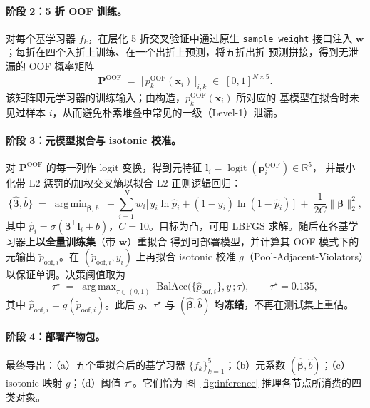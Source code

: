 \documentclass[UTF8,11pt,a4paper,fontset=ubuntu]{ctexart}
\newcommand{\Pof}{\mathbf{P}^{\mathrm{OOF}}}
\newcommand{\logit}{\operatorname{logit}}
\newcommand{\RR}{\mathbb{R}}
\newcommand{\ptilde}{\tilde p}
\newcommand{\phat}{\hat p}
\newcommand{\taustar}{\tau^{\star}}
\DeclareMathOperator*{\argmin}{arg\,min}
\DeclareMathOperator*{\argmax}{arg\,max}
\begin{document}
\paragraph{阶段 2：5 折 OOF 训练。}
对每个基学习器 $f_k$，在层化 5 折交叉验证中通过原生 \texttt{sample\_weight}
接口注入 $\mathbf{w}$；每折在四个入折上训练、在一个出折上预测，将五折出折
预测拼接，得到无泄漏的 OOF 概率矩阵
\[
\Pof \;=\; \bigl[\,p_k^{\mathrm{OOF}}(\mathbf{x}_i)\,\bigr]_{i,k}
\;\in\; [0,1]^{N\times 5}.
\]
该矩阵即元学习器的训练输入；由构造，$p_k^{\mathrm{OOF}}(\mathbf{x}_i)$ 所对应的
基模型在拟合时未见过样本 $i$，从而避免朴素堆叠中常见的一级（Level-1）泄漏。

\paragraph{阶段 3：元模型拟合与 isotonic 校准。}
对 $\Pof$ 的每一列作 logit 变换，得到元特征
$\mathbf{l}_i = \logit(\mathbf{p}_i^{\mathrm{OOF}})\in\RR^{5}$，
并最小化带 L2 惩罚的加权交叉熵以拟合 L2 正则逻辑回归：
\begin{equation}
\label{eq:meta-objective}
\{\hat{\bm\beta},\hat b\}
\;=\;
\argmin_{\bm\beta,\,b}\;
-\sum_{i=1}^{N} w_i
\bigl[\,y_i\ln\hat p_i + (1-y_i)\ln(1-\hat p_i)\,\bigr]
\;+\;\frac{1}{2C}\|\bm\beta\|_2^{2},
\end{equation}
其中 $\hat p_i = \sigma(\bm\beta^{\!\top}\mathbf{l}_i + b)$，$C=10$。目标为凸，可用
LBFGS 求解。随后在各基学习器上\textbf{以全量训练集}（带 $\mathbf{w}$）重拟合
得到可部署模型，并计算其 OOF 模式下的元输出 $\ptilde_{\mathrm{oof},i}$。在
$(\ptilde_{\mathrm{oof},i}, y_i)$ 上再拟合 isotonic 校准 $g$（Pool-Adjacent-Violators）以保证单调。决策阈值取为
\[
\taustar \;=\; \argmax_{\tau\in(0,1)}\;
\mathrm{BalAcc}\!\bigl(\{\phat_{\mathrm{oof},i}\}, y\,;\tau\bigr),
\qquad \taustar = 0.135,
\]
其中 $\phat_{\mathrm{oof},i} = g(\ptilde_{\mathrm{oof},i})$。此后 $g$、$\taustar$ 与
$(\hat{\bm\beta},\hat b)$ 均\textbf{冻结}，不再在测试集上重估。

\paragraph{阶段 4：部署产物包。}
最终导出：（a）五个重拟合后的基学习器 $\{f_k\}_{k=1}^{5}$；（b）元系数
$(\hat{\bm\beta},\hat b)$；（c）isotonic 映射 $g$；（d）阈值 $\taustar$。它们恰为
图~\ref{fig:inference} 推理各节点所消费的四类对象。
\end{document}
